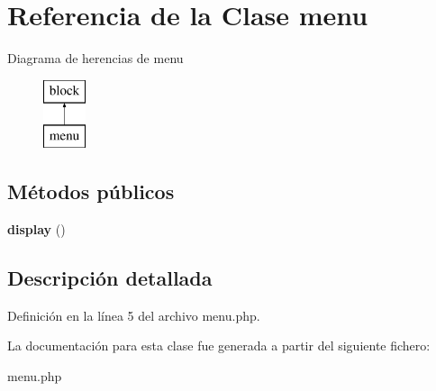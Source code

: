 \hypertarget{classmenu}{\section{\-Referencia de la \-Clase menu}
\label{classmenu}
}
\-Diagrama de herencias de menu\begin{figure}[H]
\begin{center}
\leavevmode
\includegraphics[height=2.000000cm]{classmenu}
\end{center}
\end{figure}
\subsection*{\-Métodos públicos}
\begin{DoxyCompactItemize}
\item 
\hypertarget{classmenu_abadf0a36d865e21da5799e2b9268edfa}{{\bfseries display} ()}\label{classmenu_abadf0a36d865e21da5799e2b9268edfa}

\end{DoxyCompactItemize}


\subsection{\-Descripción detallada}


\-Definición en la línea 5 del archivo menu.\-php.



\-La documentación para esta clase fue generada a partir del siguiente fichero\-:\begin{DoxyCompactItemize}
\item 
menu.\-php\end{DoxyCompactItemize}
